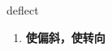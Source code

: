 
\begin{frame}
{\huge deflect}
\begin{center}
\begin{enumerate}\Large
  \item \textbf{使偏斜，使转向}
\end{enumerate}
\end{center}
\end{frame}
